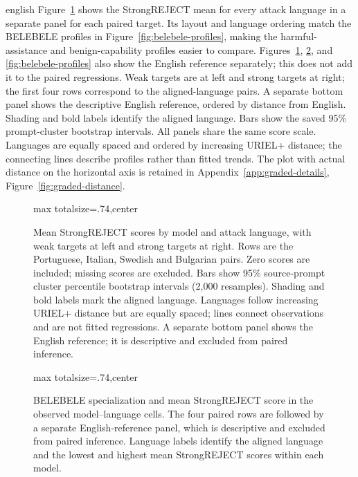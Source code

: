 \begin{otherlanguage*}{english}
\GradedCorrelationsTable
\clearpage
Figure~\ref{fig:strongreject-profiles} shows the StrongREJECT mean for every attack language in a separate panel for each paired target. Its layout and language ordering match the BELEBELE profiles in Figure~\ref{fig:belebele-profiles}, making the harmful-assistance and benign-capability profiles easier to compare. Figures~\ref{fig:strongreject-profiles}, \ref{fig:graded-spec}, and \ref{fig:belebele-profiles} also show the English reference separately; this does not add it to the paired regressions. Weak targets are at left and strong targets at right; the first four rows correspond to the aligned-language pairs. A separate bottom panel shows the descriptive English reference, ordered by distance from English. Shading and bold labels identify the aligned language. Bars show the saved 95\% prompt-cluster bootstrap intervals. All panels share the same score scale. Languages are equally spaced and ordered by increasing URIEL+ distance; the connecting lines describe profiles rather than fitted trends. The plot with actual distance on the horizontal axis is retained in Appendix~\ref{app:graded-details}, Figure~\ref{fig:graded-distance}.
\begin{figure}[p]\centering
\begin{adjustbox}{max totalsize={\linewidth}{.74\textheight},center}\end{adjustbox}
\caption[StrongREJECT profiles by model and attack language]{Mean StrongREJECT scores by model and attack language, with weak targets at left and strong targets at right. Rows are the Portuguese, Italian, Swedish and Bulgarian pairs. Zero scores are included; missing scores are excluded. Bars show 95\% source-prompt cluster percentile bootstrap intervals (2,000 resamples). Shading and bold labels mark the aligned language. Languages follow increasing URIEL+ distance but are equally spaced; lines connect observations and are not fitted regressions. A separate bottom panel shows the English reference; it is descriptive and excluded from paired inference.}\label{fig:strongreject-profiles}
\end{figure}
\begin{figure}[p]\centering
\begin{adjustbox}{max totalsize={\linewidth}{.74\textheight},center}\end{adjustbox}
\caption{BELEBELE specialization and mean StrongREJECT score in the observed model--language cells. The four paired rows are followed by a separate English-reference panel, which is descriptive and excluded from paired inference. Language labels identify the aligned language and the lowest and highest mean StrongREJECT scores within each model.}\label{fig:graded-spec}

\end{figure}
\end{otherlanguage*}
